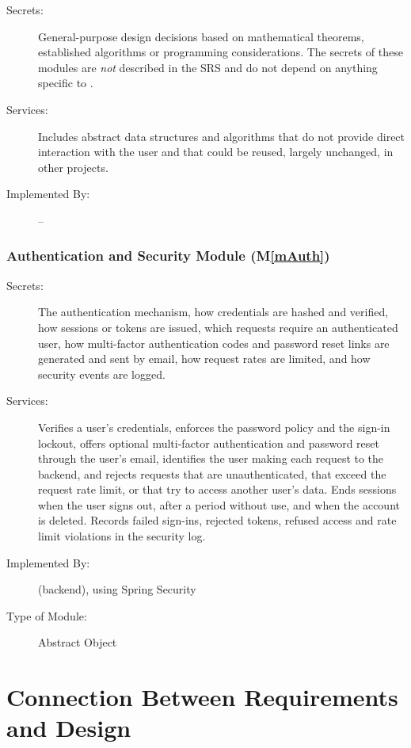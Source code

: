 \documentclass[12pt, titlepage]{article}
\newcommand{\mref}[1]{M\ref{#1}}
\begin{document}
\begin{description}
\item[Secrets:] General-purpose design decisions based on mathematical
  theorems, established algorithms or programming considerations. The secrets
  of these modules are \emph{not} described in the SRS and do not depend on
  anything specific to \progname{}.
\item[Services:] Includes abstract data structures and algorithms that do not
  provide direct interaction with the user and that could be reused, largely
  unchanged, in other projects.
\item[Implemented By:] --
\end{description}

\subsubsection{Authentication and Security Module (\mref{mAuth})}

\begin{description}
\item[Secrets:] The authentication mechanism, how credentials are hashed and
  verified, how sessions or tokens are issued, which requests require an
  authenticated user, how multi-factor authentication codes and password reset
  links are generated and sent by email, how request rates are limited, and how
  security events are logged.
\item[Services:] Verifies a user's credentials, enforces the password policy
  and the sign-in lockout, offers optional multi-factor authentication and
  password reset through the user's email, identifies the user making each
  request to the backend, and rejects requests that are unauthenticated, that
  exceed the request rate limit, or that try to access another user's data.
  Ends sessions when the user signs out, after a period without use, and when
  the account is deleted. Records failed sign-ins, rejected tokens, refused
  access and rate limit violations in the security log.
\item[Implemented By:] \progname{} (backend), using Spring Security
\item[Type of Module:] Abstract Object
\end{description}

\section{Connection Between Requirements and Design} \label{SecConnection}
\end{document}
